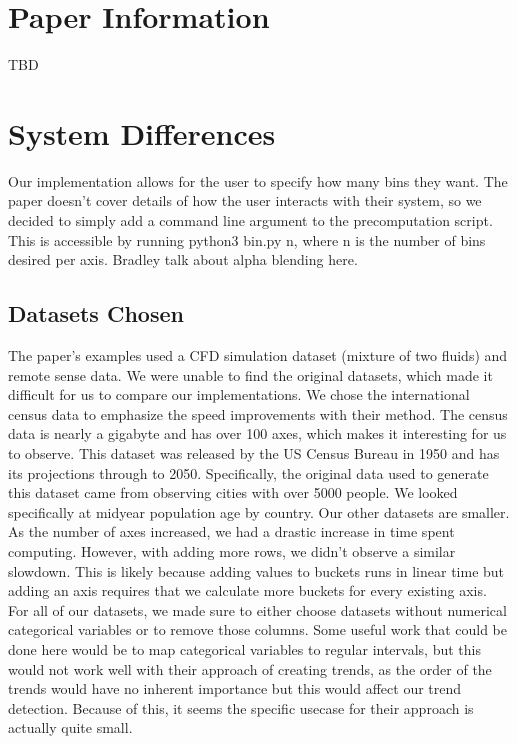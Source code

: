 \documentclass[	DIV=calc,%
			paper=a4,%
			fontsize=11pt,%
			twocolumn]{scrartcl}					%
\begin{document}
\section {Paper Information}
TBD

\section {System Differences}
Our implementation allows for the user to specify how many bins they want. The paper doesn’t cover details of how the user interacts with their system, so we decided to simply add a command line argument to the precomputation script. This is accessible by running python3 bin.py n, where n is the number of bins desired per axis. 
Bradley talk about alpha blending here. 

\subsection {Datasets Chosen}
The paper’s examples used a CFD simulation dataset (mixture of two fluids) and remote sense data. We were unable to find the original datasets, which made it difficult for us to compare our implementations. 
We chose the international census data to emphasize the speed improvements with their method. The census data is nearly a gigabyte and has over 100 axes, which makes it interesting for us to observe. This dataset was released by the US Census Bureau in 1950 and has its projections through to 2050. Specifically, the original data used to generate this dataset came from observing cities with over 5000 people. We looked specifically at midyear population age by country. 
Our other datasets are smaller. As the number of axes increased, we had a drastic increase in time spent computing. However, with adding more rows, we didn’t observe a similar slowdown. This is likely because adding values to buckets runs in linear time but adding an axis requires that we calculate more buckets for every existing axis. \\

For all of our datasets, we made sure to either choose datasets without numerical categorical variables or to remove those columns. Some useful work that could be done here would be to
map categorical variables to regular intervals, but this would not work well with their approach of creating trends, as the order of the trends would have no inherent importance
but this would affect our trend detection. Because of this, it seems the specific usecase for their approach is actually quite small. 
\end{document}
